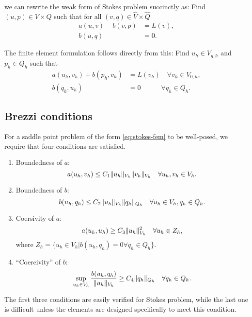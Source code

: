 we can rewrite the weak form of Stokes problem succinctly as:
Find $(u, p) \in V \times Q$ such that for all $(v, q) \in \hat{V} \times \hat{Q}$
\begin{equation}
    \begin{split}
        a(u, v) - b(v, p) &= L(v), \\
        b(u, q) &= 0.
    \end{split}
\end{equation}

The finite element formulation follows directly from this:
Find $u_h \in V_{g, h}$ and $p_h \in Q_h$ such that
\begin{equation}\label{eq:stokes-fem}
    \begin{split}
        a(u_h, v_h) + b(p_h, v_h) &= L(v_h) \quad \forall v_h \in V_{0, h}, \\
        b(q_h, u_h) &= 0 \quad\qquad \forall q_h \in Q_h.
    \end{split}
\end{equation}

\subsection{Brezzi conditions}
For a saddle point problem of the form \cref{eq:stokes-fem} to be well-posed, we require that four conditions are satisfied.
\begin{enumerate}
    \item Boundedness of $a$:
        \begin{equation}
            a(u_h, v_h) \leq C_1 \lVert u_h\rVert_{V_h} \lVert v_{h}\rVert_{V_h}
            \quad
            \forall u_h, v_h \in V_h.
        \end{equation}

    \item Boundedness of $b$:
        \begin{equation}
            b(u_h, q_h) \leq C_2 \lVert u_h\rVert_{V_h} \lVert q_{h}\rVert_{Q_h}
            \quad
            \forall {
                u_h \in V_h,
                q_h \in Q_h.
            }
        \end{equation}

    \item Coersivity of $a$:
        \begin{equation}
            a(u_h, u_h) \geq C_3 \lVert u_h\rVert_{V_h}^2
            \quad
            \forall u_h \in Z_h,
        \end{equation}
        where $Z_h = \{ u_h \in V_h | b(u_h, q_h) = 0 \forall q_h \in Q_h \}$.

    \item ``Coercivity'' of $b$:
        \begin{equation}
            \sup_{u_h \in V_h} \frac{
                b(u_h, q_h)
            }{
                \lVert u_h\rVert_{V_h}
            } \geq C_4 \lVert q_h\rVert_{Q_h}
            \quad
            \forall q_h \in Q_h.
        \end{equation}
\end{enumerate}
The first three conditions are easily verified for Stokes problem, while the last one is difficult unless the elements are designed specifically to meet this condition.